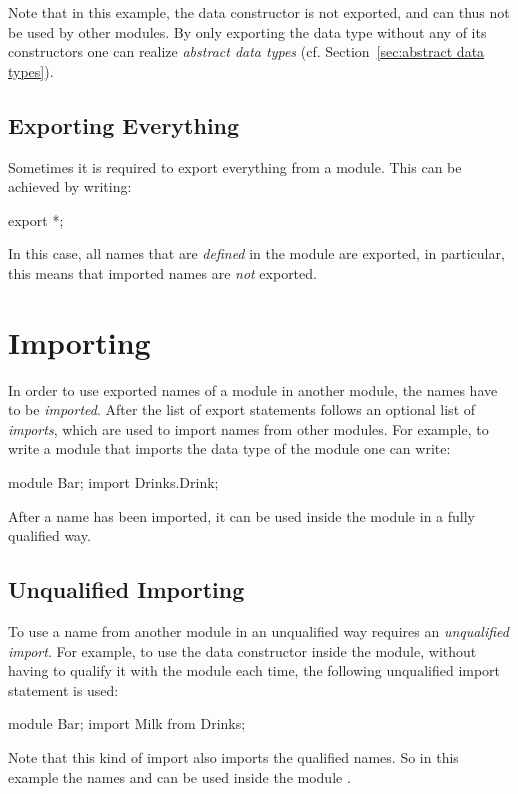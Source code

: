 Note that in this example, the data constructor  is not exported, and can thus not be used by other modules.
By only exporting the data type without any of its constructors one can realize \emph{abstract data types} (cf. Section~\ref{sec:abstract data types}).

\subsection{Exporting Everything}
Sometimes it is required to export everything from a module. 
This can be achieved by writing:
\begin{abscode}
export *;
\end{abscode}
In this case, all names that are \emph{defined} in the module are exported, in particular, this means that imported names are \emph{not} exported.

\section{Importing}
In order to use exported names of a module in another module, the names have to be \emph{imported}.
After the list of export statements follows an optional list of \emph{imports}, which are used to import names from other modules.
For example, to write a module that imports the  data type of the module  one can write:
\begin{abscode}
module Bar;
import Drinks.Drink;  
\end{abscode}
After a name has been imported, it can be used inside the module in a fully qualified way.

\subsection{Unqualified Importing}
To use a name from another module in an unqualified way requires an
\emph{unqualified import}.
For example, to use the  data constructor inside the
 module, without having to qualify it with the 
module each time, the following unqualified import statement is used:
\begin{abscode}
module Bar;
import Milk from Drinks;
\end{abscode}
Note that this kind of import also imports the qualified names. 
So in this example the names  and  can be used inside the module .

